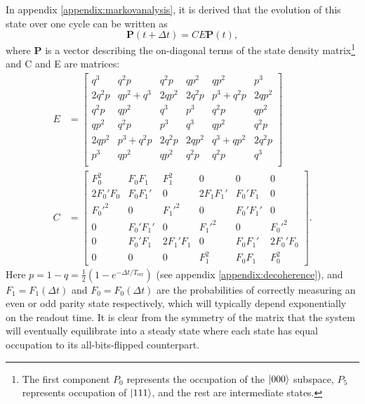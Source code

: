\documentclass{report}
\begin{document}
In appendix \ref{appendix:markovanalysis}, it is derived that the evolution of this state over one cycle can be written as 
\begin{equation*}
    \mathbf{P}(t + \Delta t) = CE\mathbf{P}(t),
\end{equation*} where $\mathbf{P}$ is a vector describing the on-diagonal terms of the state density matrix\footnote{The first component $P_0$ represents the occupation of the $\ket{000}$ subspace, $P_5$ represents occupation of $\ket{111}$, and the rest are intermediate states.} and C and E are matrices:
\begin{align*}
    E &=     
    \begin{bmatrix}
        q^3& q^2p& q^2p& qp^2& qp^2& p^3 \\
        2 q^2p& qp^2 + q^3& 2 qp^2& 2 q^2p& p^3 + q^2p& 2 qp^2\\
        q^2p& qp^2& q^3& p^3& q^2p& qp^2\\
        qp^2& q^2p& p^3& q^3& qp^2& q^2p\\
        2 qp^2& p^3 + q^2p& 2 q^2p& 2 qp^2& q^3 + qp^2& 2 q^2p\\
        p^3& qp^2& qp^2& q^2p& q^2p& q^3\\
    \end{bmatrix}\\
    C &= 
    \begin{bmatrix}
        F_0^2 & F_0 F_1 & F_1^2 & 0 & 0 & 0 \\
        2F_0'F_0 & F_0 F_1' & 0 & 2F_1 F_1' & F_0' F_1 & 0\\
        F_0'^2 & 0 & F_1'^2 & 0 & F_0' F_1' & 0 \\
        0 & F_0' F_1' & 0 & F_1'^2 & 0 &F_0'^2 \\
        0 &F_0' F_1 & 2F_1' F_1&0&F_0F_1'&2F_0'F_0 \\
        0&0&0& F_1^2 &F_0 F_1 & F_0^2
    \end{bmatrix}.
\end{align*} Here $p = 1-q = \frac{1}{2}(1-e^{-\Delta t /T_{\text{err}}})$ (see appendix \ref{appendix:decoherence}), and $F_1 = F_1(\Delta t)$ and $F_0 = F_0(\Delta t)$ are the probabilities of correctly measuring an even or odd parity state respectively, which will typically depend exponentially on the readout time. It is clear from the symmetry of the matrix that the system will eventually equilibrate into a steady state where each state has equal occupation to its all-bits-flipped counterpart.
\end{document}
